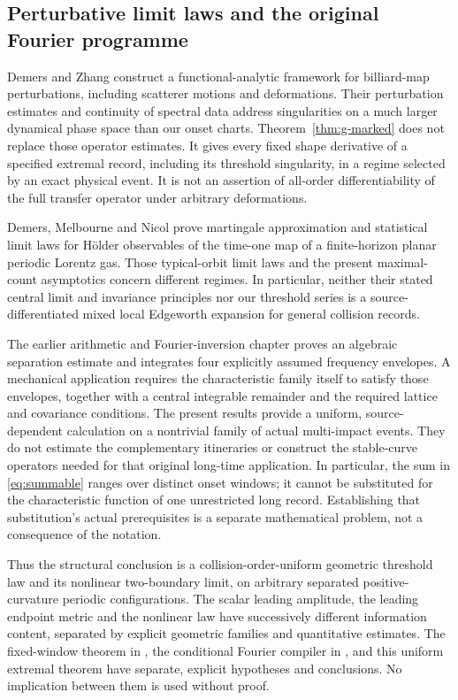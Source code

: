 \subsection{Perturbative limit laws and the original Fourier programme}
Demers and Zhang \cite{DemersZhang} construct a functional-analytic
framework for billiard-map perturbations, including scatterer motions and
deformations. Their perturbation estimates and continuity of spectral
data address singularities on a much larger dynamical phase space than
our onset charts. Theorem~\ref{thm:g-marked} does not replace those operator
estimates. It gives every fixed shape derivative of a specified extremal
record, including its threshold singularity, in a regime selected by an
exact physical event. It is not an assertion of all-order differentiability
of the full transfer operator under arbitrary deformations.

Demers, Melbourne and Nicol \cite{DMN} prove martingale approximation and
statistical limit laws for H\"older observables of the time-one map of a
finite-horizon planar periodic Lorentz gas. Those typical-orbit limit laws
and the present maximal-count asymptotics concern different regimes.
In particular, neither their stated central limit and invariance principles
nor our threshold series is a source-differentiated mixed local Edgeworth
expansion for general collision records.

The earlier arithmetic and Fourier-inversion chapter \cite{A2R33} proves
an algebraic separation estimate and integrates four explicitly assumed
frequency envelopes. A mechanical application requires the characteristic
family itself to satisfy those envelopes, together with a central
integrable remainder and the required lattice and covariance conditions.
The present results provide a uniform, source-dependent calculation on a
nontrivial family of actual multi-impact events. They do not estimate the
complementary itineraries or construct the stable-curve operators needed
for that original long-time application. In particular, the sum in
\eqref{eq:summable} ranges over distinct onset windows; it cannot be
substituted for the characteristic function of one unrestricted long
record. Establishing that substitution's actual prerequisites is a
separate mathematical problem, not a consequence of the notation.

Thus the structural conclusion is a collision-order-uniform geometric
threshold law and its nonlinear two-boundary limit, on arbitrary
separated positive-curvature periodic configurations. The scalar
leading amplitude, the leading endpoint metric and the nonlinear law
have successively different information content, separated by explicit
geometric families and quantitative estimates. The
fixed-window theorem in \cite{TC}, the conditional Fourier compiler in
\cite{A2R33}, and this uniform extremal theorem have separate, explicit
hypotheses and conclusions. No implication between them is used without
proof.
